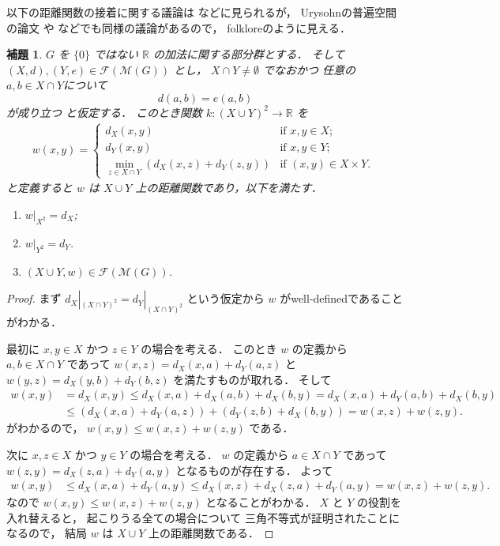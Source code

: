 \documentclass[leqno, 12pt]{jsarticle}
\newtheorem{lem}[thm]{補題}
\newcommand{\rr}{\mathbb{R}}
\begin{document}
以下の距離関数の接着に関する議論は 
\cite[Theorem 2.1]{Bo2002}
などに見られるが，
Urysohnの普遍空間の論文
 \cite{Ury1}
 や
  \cite{Ury2}などでも同様の議論があるので，
folkloreのように見える．
\begin{lem}\label{lem:amal:pushout1}
$G$
を
$\{0\}$
ではない
$\rr$
の加法に関する部分群とする．
そして
$(X, d), (Y, e)\in \mathscr{F}(\mathscr{M}(G))$
とし，
$X\cap Y\neq \emptyset$
でなおかつ
任意の
$a, b\in X\cap Y$について
\[
d(a, b)=e(a, b)
\]
が成り立つ
と仮定する．
このとき関数
$k\colon  (X\cup Y)^2\to \rr$
を
\begin{align*}
	w(x, y)=
		\begin{cases}
		d_{X}(x, y) & \text{if $x, y\in X$;}\\
		d_{Y}(x, y) & \text{if $x, y\in Y$;}\\
		\min_{z\in X\cap Y}(d_{X}(x, z)+d_{Y}(z, y)) & \text{if $(x, y)\in X\times Y$. }
		\end{cases}
\end{align*} 
と定義すると
$w$
は
$X\cup Y$
上の距離関数であり，以下を満たす．
\begin{enumerate}
\item $w|_{X^2}=d_{X}$; 
	\item 
	$w|_{Y^2}=d_{Y}$. 
	
	
	\item 
	$(X\cup Y, w)\in \mathscr{F}(\mathscr{M}(G))$. 
\end{enumerate}




\end{lem}
\begin{proof}
まず
$d_{X}|_{(X\cap Y)^2}=d_{Y}|_{(X\cap Y)^2}$
という仮定から
$w$
がwell-definedであることがわかる．


最初に
$x, y\in X$ 
かつ
$z\in Y$
の場合を考える．
このとき
$w$
の定義から
$a, b\in X\cap Y$
であって
$w(x, z)=d_{X}(x, a)+d_{Y}(a, z)$
と
$w(y, z)=d_{X}(y, b)+d_{Y}(b, z)$
を満たすものが取れる．
そして
\begin{align*}
	w(x, y)&=
	d_{X}(x, y)\le d_{X}(x, a)+d_{X}(a, b)+d_{X}(b, y)
	=d_{X}(x, a)+d_{Y}(a, b)+d_{X}(b, y)\\
	&\le (d_{X}(x, a)+d_{Y}(a, z))+(d_{Y}(z, b)+d_{X}(b, y))
	=w(x, z)+w(z, y). 
\end{align*}
がわかるので， 
$w(x, y)\le w(x, z)+w(z, y)$
である．



次に
$x, z\in  X$
かつ
$y\in Y$
の場合を考える．
$w$
の定義から
$a\in X\cap Y$
であって
$w(z, y)=d_{X}(z, a)+d_{Y}(a, y)$
となるものが存在する．
よって
\begin{align*}
	w(x, y)
	&\le
	 d_{X}(x, a)+d_{Y}(a, y)
	\le 
	d_{X}(x, z)+d_{X}(z, a)+d_{Y}(a, y)
	=w(x, z)+w(z, y). 
\end{align*}
なので
$w(x, y)\le w(x, z)+w(z, y)$
となることがわかる．
$X$
と
$Y$
の役割を入れ替えると，
起こりうる全ての場合について
三角不等式が証明されたことになるので，
結局
$w$ 
は
$X\cup Y$
上の距離関数である．
\end{proof}
\end{document}
